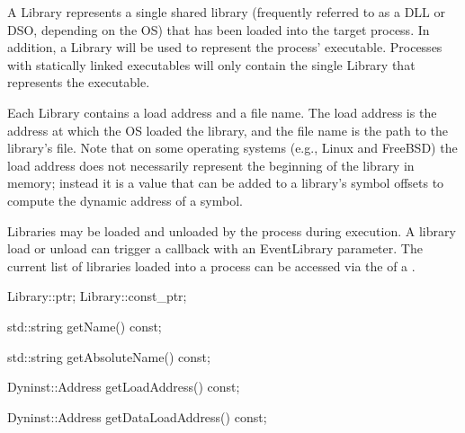 
A Library represents a single shared library (frequently
referred to as a DLL or DSO, depending on the OS) that has been loaded into the
target process. In addition, a Library will be used to represent the
process' executable. Processes with statically linked executables
will only contain the single Library that
represents the executable.

Each Library contains a load address and a file
name. The load address is the address at which the OS loaded the library, and
the file name is the path to the library's file. Note
that on some operating systems (e.g., Linux and FreeBSD) the load
address does not necessarily represent the beginning of the library in memory;
instead it is a value that can be added to a library's
symbol offsets to compute the dynamic address of a symbol.

Libraries may be loaded and unloaded by the process during execution. A
library load or unload can trigger a callback with an EventLibrary parameter.
The current list of libraries loaded into a process can be accessed via the
 of a .

\begin{apient}
  Library::ptr;
  Library::const_ptr;
\end{apient}


\begin{apient}
  std::string getName() const;
\end{apient}


\begin{apient}
  std::string getAbsoluteName() const;
\end{apient}


\begin{apient}
  Dyninst::Address getLoadAddress() const;
\end{apient}


\begin{apient}
  Dyninst::Address getDataLoadAddress() const;
\end{apient}

